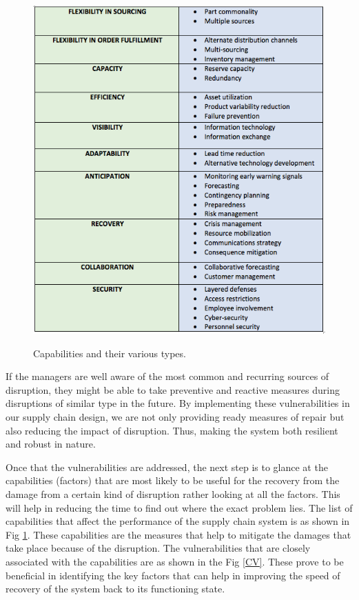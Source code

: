 \begin{figure}[H]
  \centering
  \includegraphics[width=6.0in]{figures/pdf/C1.png}\\
  \caption{Capabilities and their various types.}\label{Capabilities}
\end{figure}

\newpage
 If the managers are well aware of the most common and recurring sources of disruption, they might be able to take preventive and reactive measures during disruptions of similar type in the future. By implementing these vulnerabilities in our supply chain design, we are not only providing ready measures of repair but also reducing the impact of disruption. Thus, making the system both resilient and robust in nature.  
 
Once that the vulnerabilities are addressed, the next step is to glance at the capabilities (factors) that are most likely to be useful for the recovery from the damage from a certain kind of disruption rather looking at all the factors. This will help in reducing the time to find out where the exact problem lies. The list of capabilities that affect the performance of the supply chain system is as shown in Fig \ref{Capabilities}. These capabilities are the measures that help to mitigate the damages that take place because of the disruption.  The vulnerabilities that are closely associated with the capabilities are as shown in the Fig \ref{CV}. These prove to be beneficial in identifying the key factors that can help in improving the speed of recovery of the system back to its functioning state. 



